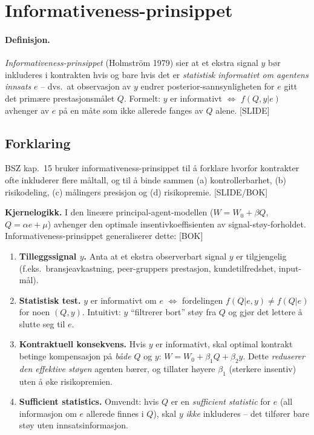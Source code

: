 \section{Informativeness-prinsippet}\label{thr:informativeness-principle}

\paragraph{Definisjon.} \emph{Informativeness-prinsippet} (Holmström 1979) sier at et ekstra signal $y$ bør inkluderes i kontrakten hvis og bare hvis det er \emph{statistisk informativt om agentens innsats} $e$ -- dvs.\ at observasjon av $y$ endrer posterior-sannsynligheten for $e$ gitt det primære prestasjonsmålet $Q$. Formelt: $y$ er informativt $\Leftrightarrow$ $f(Q,y|e)$ avhenger av $e$ på en måte som ikke allerede fanges av $Q$ alene. [SLIDE]

\subsection*{Forklaring}

BSZ kap.\ 15 bruker informativeness-prinsippet til å forklare hvorfor kontrakter ofte inkluderer flere måltall, og til å binde sammen (a) kontrollerbarhet, (b) risikodeling, (c) målingers presisjon og (d) risikopremie. [SLIDE/BOK]

\textbf{Kjernelogikk.} I den lineære principal-agent-modellen ($W=W_0+\beta Q$, $Q=\alpha e+\mu$) avhenger den optimale insentivkoeffisienten  av signal-støy-forholdet. Informativeness-prinsippet generaliserer dette: [BOK]

\begin{enumerate}\setlength{\itemsep}{2pt}
\item \textbf{Tilleggssignal $y$.} Anta at et ekstra observerbart signal $y$ er tilgjengelig (f.eks.\ bransjeavkastning, peer-gruppers prestasjon, kundetilfredshet, input-mål).
\item \textbf{Statistisk test.} $y$ er informativt om $e$ $\Leftrightarrow$ fordelingen $f(Q|e,y) \neq f(Q|e)$ for noen $(Q,y)$. Intuitivt: $y$ ``filtrerer bort'' støy fra $Q$ og gjør det lettere å slutte seg til $e$.
\item \textbf{Kontraktuell konsekvens.} Hvis $y$ er informativt, skal optimal kontrakt betinge kompensasjon på \emph{både} $Q$ og $y$: $W = W_0 + \beta_1 Q + \beta_2 y$. Dette \emph{reduserer den effektive støyen} agenten bærer, og tillater høyere $\beta_1$ (sterkere insentiv) uten å øke risikopremien.
\item \textbf{Sufficient statistics.} Omvendt: hvis $Q$ er en \emph{sufficient statistic} for $e$ (all informasjon om $e$ allerede finnes i $Q$), skal $y$ \emph{ikke} inkluderes -- det tilfører bare støy uten innsatsinformasjon.
\end{enumerate}

